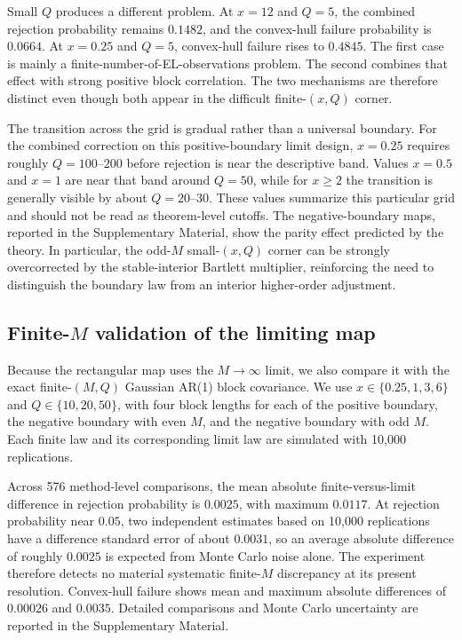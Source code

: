 \documentclass[12pt]{article}
\theoremstyle{remark}
\begin{document}
Small $Q$ produces a different problem. At $x=12$ and $Q=5$, the combined rejection probability remains $0.1482$, and the convex-hull failure probability is $0.0664$. At $x=0.25$ and $Q=5$, convex-hull failure rises to $0.4845$. The first case is mainly a finite-number-of-EL-observations problem. The second combines that effect with strong positive block correlation. The two mechanisms are therefore distinct even though both appear in the difficult finite-$(x,Q)$ corner.

The transition across the grid is gradual rather than a universal boundary. For the combined correction on this positive-boundary limit design, $x=0.25$ requires roughly $Q=100$--$200$ before rejection is near the descriptive band. Values $x=0.5$ and $x=1$ are near that band around $Q=50$, while for $x\ge2$ the transition is generally visible by about $Q=20$--$30$. These values summarize this particular grid and should not be read as theorem-level cutoffs. The negative-boundary maps, reported in the Supplementary Material, show the parity effect predicted by the theory. In particular, the odd-$M$ small-$(x,Q)$ corner can be strongly overcorrected by the stable-interior Bartlett multiplier, reinforcing the need to distinguish the boundary law from an interior higher-order adjustment.

\subsection{Finite-$M$ validation of the limiting map}
Because the rectangular map uses the $M\to\infty$ limit, we also compare it with the exact finite-$(M,Q)$ Gaussian AR(1) block covariance. We use $x\in\{0.25,1,3,6\}$ and $Q\in\{10,20,50\}$, with four block lengths for each of the positive boundary, the negative boundary with even $M$, and the negative boundary with odd $M$. Each finite law and its corresponding limit law are simulated with 10,000 replications.

Across 576 method-level comparisons, the mean absolute finite-versus-limit difference in rejection probability is $0.0025$, with maximum $0.0117$. At rejection probability near $0.05$, two independent estimates based on 10,000 replications have a difference standard error of about $0.0031$, so an average absolute difference of roughly $0.0025$ is expected from Monte Carlo noise alone. The experiment therefore detects no material systematic finite-$M$ discrepancy at its present resolution. Convex-hull failure shows mean and maximum absolute differences of $0.00026$ and $0.0035$. Detailed comparisons and Monte Carlo uncertainty are reported in the Supplementary Material.
\end{document}
